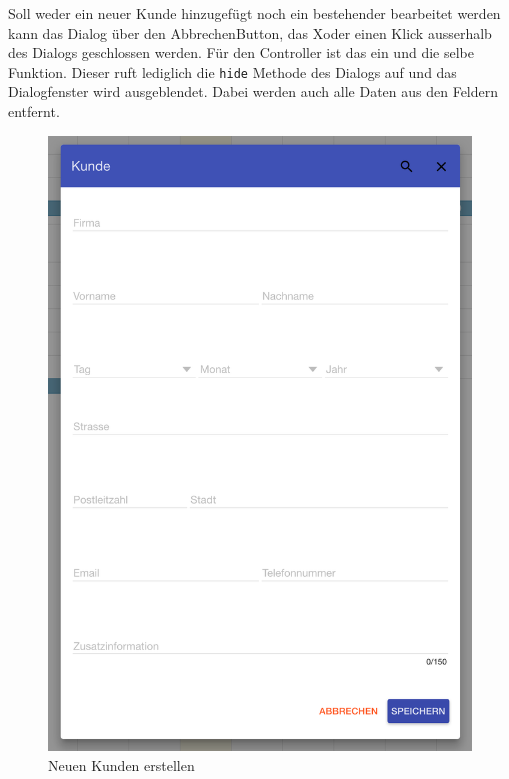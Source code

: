 Soll weder ein neuer Kunde hinzugefügt noch ein bestehender bearbeitet werden kann das Dialog über den \grqq Abbrechen\glqq Button, das \grqq X\glqq oder einen Klick ausserhalb des Dialogs geschlossen werden. Für den Controller ist das ein und die selbe Funktion. Dieser ruft lediglich die \texttt{hide} Methode des Dialogs auf und das Dialogfenster wird ausgeblendet. Dabei werden auch alle Daten aus den Feldern entfernt.

\begin{figure}[H]
    \centering
    \begin{minipage}[t]{0.49\linewidth}
        \centering
        \includegraphics[width=\linewidth]{images/frontend_customer_new.png}
        \caption{Neuen Kunden erstellen}
    \end{minipage}%
    \hfill

\end{figure}
